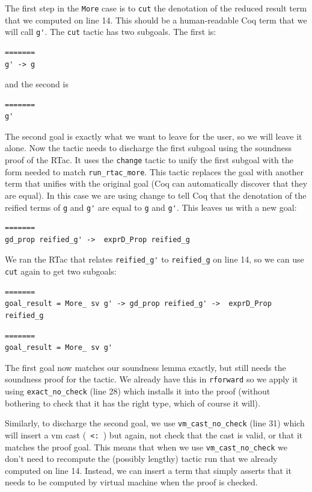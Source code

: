 \documentclass{puthesis}
\begin{document}
The first step in the \lstinline|More| case is to \lstinline|cut| the
denotation of the reduced result term that we computed on line
14. This should be a human-readable Coq term that we will call
\lstinline|g'|. 
The \lstinline|cut| tactic has two subgoals. The first is:

\begin{lstlisting}
=======
g' -> g
\end{lstlisting}

and the second is

\begin{lstlisting}
=======
g'
\end{lstlisting}

The second goal is exactly what we want to leave for the user, so we
will leave it alone. Now the tactic needs to discharge the first
subgoal using the soundness proof of the RTac. It uses the
\lstinline|change| tactic to unify the first subgoal with the form
needed to match \lstinline|run_rtac_more|. This tactic replaces the
goal with another term that unifies with the original goal (Coq can
automatically discover that they are equal). In this case we are using
change to tell Coq that the denotation of the reified terms of
\lstinline|g| and \lstinline|g'| are equal to \lstinline|g| and
\lstinline|g'|. This leaves us with a new goal:

\begin{lstlisting}
=======
gd_prop reified_g' ->  exprD_Prop reified_g
\end{lstlisting}

We ran the RTac that relates \lstinline|reified_g'| to
\lstinline|reified_g| on line 14, so we can use \lstinline|cut| again
to get two subgoals:

\begin{lstlisting}
=======
goal_result = More_ sv g' -> gd_prop reified_g' ->  exprD_Prop reified_g
\end{lstlisting}

\begin{lstlisting}
=======
goal_result = More_ sv g'
\end{lstlisting}

The first goal now matches our soundness lemma exactly, but still
needs the soundness proof for the tactic. We already have this in
\lstinline|rforward| so we apply it using \lstinline|exact_no_check|
(line 28) which installs it into the proof (without bothering to check
that it has the right type, which of course it will).

Similarly, to discharge the second goal, we use 
\lstinline|vm_cast_no_check| (line 31) which will insert a vm cast (\lstinline| <: |)
but again, not check that the cast is valid, or that it matches the proof
goal. This means that when we use \lstinline|vm_cast_no_check| we
don't need to recompute the (possibly lengthy) tactic run that we
already computed on line 14. Instead, we can insert a term that simply
asserts that it needs to be computed by virtual machine when the proof
is checked.
\end{document}
